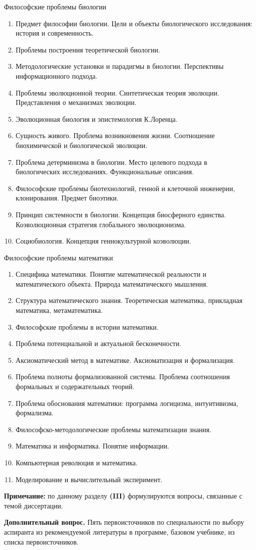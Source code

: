 \documentclass[main.tex]{subfiles}
\begin{document}
\vspace{4mm}
\centerline{Философские проблемы биологии}
\begin{enumerate}[nosep,leftmargin=*]
	\item Предмет философии биологии. Цели и объекты биологического исследования: история и современность.
	\item Проблемы построения теоретической биологии.
	\item Методологические установки и парадигмы в биологии. Перспективы информационного подхода.
	\item Проблемы эволюционной теории. Синтетическая теория эволюции. Представления о механизмах эволюции.
	\item Эволюционная биология и эпистемология К.Лоренца.
	\item Сущность живого. Проблема возникновения жизни. Соотношение биохимической и биологической эволюции.
	\item Проблема детерминизма в биологии. Место целевого подхода в биологических исследованиях. Функциональные описания.
	\item Философские проблемы биотехнологий, генной и клеточной инженерии, клонирования. Предмет биоэтики.
	\item Принцип системности в биологии. Концепция биосферного единства. Коэволюционная стратегия глобального эволюционизма.
	\item Социобиология. Концепция геннокультурной коэволюции.	
\end{enumerate}

\vspace{4mm}
\centerline{Философские проблемы математики}
\begin{enumerate}[nosep,leftmargin=*]
	\item Специфика математики. Понятие математической реальности и математического объекта. Природа математического мышления.
	\item Структура математического знания. Теоретическая математика, прикладная математика, метаматематика.
	\item Философские проблемы в истории математики.
	\item Проблема потенциальной и актуальной бесконечности.
	\item Аксиоматический метод в математике. Аксиоматизация и формализация.
	\item Проблема полноты формализованной системы. Проблема соотношения формальных и содержательных теорий.
	\item Проблема обоснования математики: программа логицизма, интуитивизма, формализма.
	\item Философско-методологические проблемы математизации знания.
	\item Математика и информатика. Понятие информации.
	\item Компьютерная революция и математика.
	\item Моделирование и вычислительный эксперимент.
\end{enumerate}

\vspace{4mm}

\textbf{Примечание:} по данному разделу \textbf{(III)} формулируются вопросы, связанные с темой диссертации.

\textbf{Дополнительный вопрос.}
Пять первоисточников по специальности по выбору аспиранта из рекомендуемой литературы в программе, базовом учебнике, из списка первоисточников.
\end{document}
